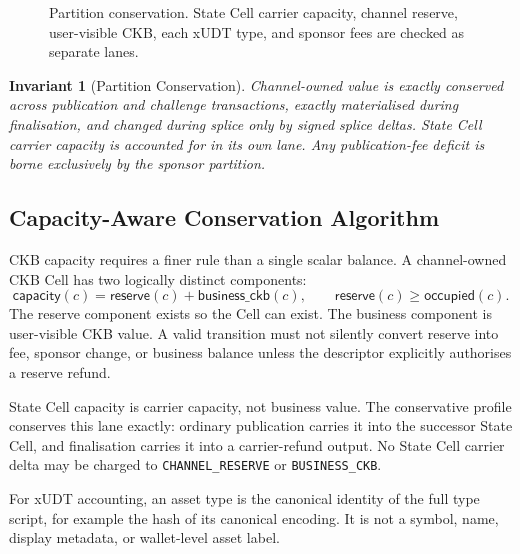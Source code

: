 \documentclass[a4paper,11pt]{article}
\newtheorem{invariant}{Invariant}
\begin{document}
\begin{figure}[H]
\caption{Partition conservation. State Cell carrier capacity, channel reserve, user-visible CKB, each xUDT type, and sponsor fees are checked as separate lanes.}
\label{fig:partition-conservation}
\end{figure}

\begin{invariant}[Partition Conservation]
Channel-owned value is exactly conserved across publication and challenge transactions, exactly materialised during finalisation, and changed during splice only by signed splice deltas. State Cell carrier capacity is accounted for in its own lane. Any publication-fee deficit is borne exclusively by the sponsor partition.
\end{invariant}

\subsection{Capacity-Aware Conservation Algorithm}

CKB capacity requires a finer rule than a single scalar balance. A channel-owned CKB Cell has two logically distinct components:
\[
\mathsf{capacity}(c)=
\mathsf{reserve}(c)+\mathsf{business\_ckb}(c),
\qquad
\mathsf{reserve}(c)\ge \mathsf{occupied}(c).
\]
The reserve component exists so the Cell can exist. The business component is user-visible CKB value. A valid transition must not silently convert reserve into fee, sponsor change, or business balance unless the descriptor explicitly authorises a reserve refund.

State Cell capacity is carrier capacity, not business value. The conservative
profile conserves this lane exactly: ordinary publication carries it into the
successor State Cell, and finalisation carries it into a carrier-refund output.
No State Cell carrier delta may be charged to \texttt{CHANNEL\_RESERVE} or
\texttt{BUSINESS\_CKB}.

For xUDT accounting, an asset type is the canonical identity of the full type script, for example the hash of its canonical encoding. It is not a symbol, name, display metadata, or wallet-level asset label.
\end{document}
